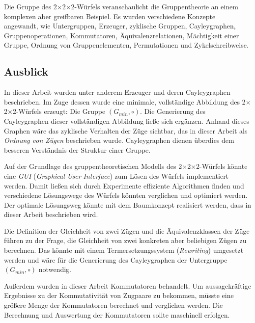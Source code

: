 \documentclass[12pt,a4paper, usenames, dvipsnames]{article}
\theoremstyle{mystyle}
\theoremstyle{definition}
\newcommand{\Ttwo}{2$\times$2$\times$2-}
\begin{document}
Die Gruppe des \Ttwo Würfels veranschaulicht die Gruppentheorie an einem komplexen aber greifbaren Beispiel. Es wurden verschiedene Konzepte angewandt, wie Untergruppen, Erzeuger, zyklische Gruppen, Cayleygraphen, Gruppenoperationen, Kommutatoren, Äquivalenzrelationen, Mächtigkeit einer Gruppe, Ordnung von Gruppenelementen, Permutationen und Zykelschreibweise. 

%
%
%
%
%
%
%
%
%
%
%
%
%
%
%
%
%
%
%
\subsection{Ausblick}

In dieser Arbeit wurden unter anderem Erzeuger und deren Cayleygraphen beschrieben. Im Zuge dessen wurde eine minimale, vollständige Abbildung des \Ttwo Würfels erzeugt: Die Gruppe $(G_{min}, \circ)$. Die Generierung des Cayleygraphen dieser vollständigen Abbildung ließe sich ergänzen. Anhand dieses Graphen wäre das zyklische Verhalten der Züge sichtbar, das in dieser Arbeit als \textit{Ordnung von Zügen} beschrieben wurde. Cayleygraphen dienen überdies dem besseren Verständnis der Struktur einer Gruppe.
 
Auf der Grundlage des gruppentheoretischen Modells des \Ttwo Würfels könnte eine \textit{GUI} (\textit{Graphical User Interface}) zum Lösen des Würfels implementiert werden. Damit ließen sich durch Experimente effiziente Algorithmen finden und verschiedene Lösungswege des Würfels könnten verglichen und optimiert werden. Der optimale Lösungsweg könnte mit dem Baumkonzept realisiert werden, dass in dieser Arbeit beschrieben wird.

Die Definition der Gleichheit von zwei Zügen und die Äquivalenzklassen der Züge führen zu der Frage, die Gleichheit von zwei konkreten aber beliebigen Zügen zu berechnen.
Das könnte mit einem Termersetzungssystem (\textit{Rewriting}) umgesetzt werden und wäre für die Generierung des Cayleygraphen der Untergruppe $(G_{min}, \circ)$ notwendig.

Außerdem wurden in dieser Arbeit Kommutatoren behandelt. Um aussagekräftige Ergebnisse zu der Kommutativität von Zugpaare zu bekommen, müsste eine größere Menge der Kommutatoren berechnet und verglichen werden. Die Berechnung und Auswertung der Kommutatoren sollte maschinell erfolgen.



%
%
%
%
%
%
%
%
%
%
%
%
%
%
%
%
%
%
%
\end{document}
